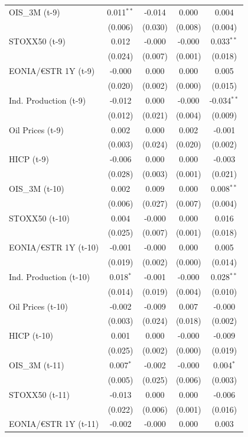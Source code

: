 \begin{longtable}[t]{lcccc}
OIS\_3M (t-9) & 0.011$^{**}$ & -0.014 & 0.000 & 0.004\\
 & (0.006) & (0.030) & (0.008) & (0.004)\\
STOXX50 (t-9) & 0.012 & -0.000 & -0.000 & 0.033$^{**}$\\
 & (0.024) & (0.007) & (0.001) & (0.018)\\
EONIA/€STR 1Y (t-9) & -0.000 & 0.000 & 0.000 & 0.005\\
 & (0.020) & (0.002) & (0.000) & \vphantom{1} (0.015)\\
Ind. Production (t-9) & -0.012 & 0.000 & -0.000 & -0.034$^{**}$\\
 & (0.012) & (0.021) & (0.004) & (0.009)\\
Oil Prices (t-9) & 0.002 & 0.000 & 0.002 & -0.001\\
 & (0.003) & (0.024) & (0.020) & (0.002)\\
HICP (t-9) & -0.006 & 0.000 & 0.000 & -0.003\\
 & (0.028) & (0.003) & (0.001) & (0.021)\\
OIS\_3M (t-10) & 0.002 & 0.009 & 0.000 & 0.008$^{**}$\\
 & (0.006) & (0.027) & (0.007) & (0.004)\\
STOXX50 (t-10) & 0.004 & -0.000 & 0.000 & 0.016\\
 & (0.025) & (0.007) & (0.001) & (0.018)\\
EONIA/€STR 1Y (t-10) & -0.001 & -0.000 & 0.000 & 0.005\\
 & (0.019) & (0.002) & (0.000) & (0.014)\\
Ind. Production (t-10) & 0.018$^{*}$ & -0.001 & -0.000 & 0.028$^{**}$\\
 & (0.014) & (0.019) & (0.004) & (0.010)\\
Oil Prices (t-10) & -0.002 & -0.009 & 0.007 & -0.000\\
 & (0.003) & (0.024) & (0.018) & (0.002)\\
HICP (t-10) & 0.001 & 0.000 & -0.000 & -0.009\\
 & (0.025) & (0.002) & (0.000) & (0.019)\\
OIS\_3M (t-11) & 0.007$^{*}$ & -0.002 & -0.000 & 0.004$^{*}$\\
 & (0.005) & (0.025) & (0.006) & (0.003)\\
STOXX50 (t-11) & -0.013 & 0.000 & 0.000 & -0.006\\
 & (0.022) & (0.006) & (0.001) & \vphantom{1} (0.016)\\
EONIA/€STR 1Y (t-11) & -0.002 & -0.000 & 0.000 & 0.003\\

\end{longtable}
